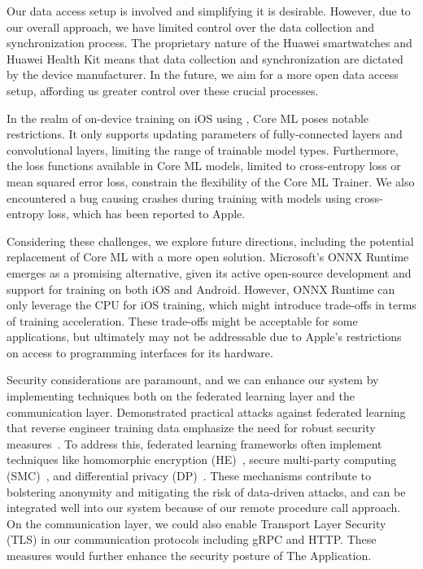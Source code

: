 Our data access setup is involved and simplifying it is desirable. However,
due to our overall approach,
we have limited control over the data collection and synchronization process.
The proprietary nature of the Huawei smartwatches and Huawei Health Kit means
that data collection and synchronization are dictated by the device
manufacturer. In the future, we aim for a more open data access setup,
affording us greater control over these crucial processes.

In the realm of on-device training on iOS using \fedkit,
Core ML poses notable restrictions.
It only supports updating parameters of fully-connected layers and convolutional
layers, limiting the range of trainable model types. Furthermore,
the loss functions available in Core ML models,
limited to cross-entropy loss or mean squared error loss,
constrain the flexibility of the Core ML Trainer. We also encountered a bug
causing crashes during training with models using cross-entropy loss,
which has been reported to Apple.

Considering these challenges, we explore future directions,
including the potential replacement of Core ML with a more open solution.
Microsoft's ONNX Runtime~\cite{onnxruntime} emerges as a promising alternative,
given its active open-source development and support for training on both iOS
and Android. However, ONNX Runtime can only leverage the CPU for iOS training,
which might introduce trade-offs in terms of training acceleration.
These trade-offs might be acceptable for some applications,
but ultimately may not be addressable due to Apple's restrictions on access to
programming interfaces for its hardware.

Security considerations are paramount,
and we can enhance our system by implementing techniques both on the federated
learning layer and the communication layer.
Demonstrated practical attacks against federated learning that reverse engineer
training data emphasize the need for robust security
measures~\cite{sun2019really}. To address this,
federated learning frameworks often implement techniques like homomorphic
encryption (HE)~\cite{wang2020homo},
secure multi-party computing (SMC)~\cite{bonawitz2016practical},
and differential privacy
(DP)~\cite{dwork2006differential,geyer2017differentially}.
These mechanisms contribute to bolstering anonymity and mitigating the risk of
data-driven attacks,
and can be integrated well into our system because of our remote procedure call
approach. On the communication layer,
we could also enable Transport Layer Security (TLS)
in our communication protocols including gRPC and HTTP. These measures would
further enhance the security posture of The \fedcampus Application.

